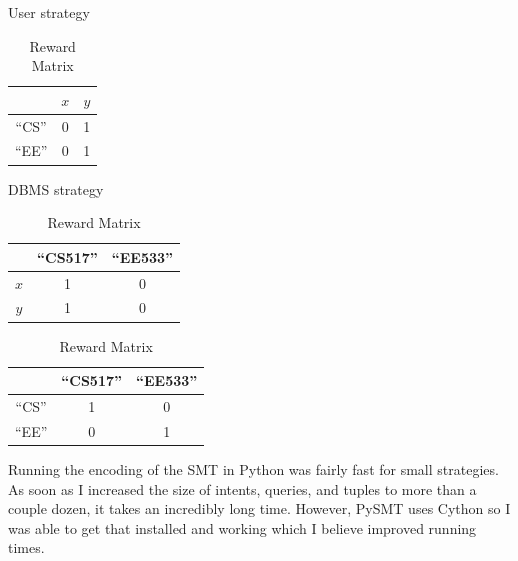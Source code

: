 \documentclass{article}
\begin{document}
\begin{table}[h!]
    \centering
    \begin{minipage}{.2\linewidth}
        \caption{User strategy}
        \centering
        \begin{tabular}{c|c|c|}
            \cline{2-3}
             & \multicolumn{1}{c|}{$x$} & $y$\\
            \hline
            \multicolumn{1}{|c|}{``CS''} & 0 & 1\\
            \hline
            \multicolumn{1}{|c|}{``EE''} & 0 & 1\\
            \hline
        \end{tabular}
        \label{paper:strategies:sender}
    \end{minipage}
    \begin{minipage}{.35\linewidth}
        \caption{DBMS strategy}
        \centering
        \begin{tabular}{c|c|c|}
            \cline{2-3}
             & \multicolumn{1}{c|}{``CS517''} & ``EE533''\\
            \hline
            \multicolumn{1}{|c|}{$x$} & 1 & 0\\
            \hline
            \multicolumn{1}{|c|}{$y$} & 1 & 0\\
            \hline
        \end{tabular}
        \label{paper:strategies:receiver}
    \end{minipage}
       \begin{minipage}{.3\linewidth}
        \caption{Reward Matrix}
        \centering
        \begin{tabular}{c|c|c|}
            \cline{2-3}
             & \multicolumn{1}{c|}{``CS517''} & ``EE533''\\
            \hline
            \multicolumn{1}{|c|}{``CS''} & 1 & 0\\
            \hline
            \multicolumn{1}{|c|}{``EE''} & 0 & 1\\
            \hline
        \end{tabular}
        \label{paper:strategies:reward}
    \end{minipage}
\end{table}

Running the encoding of the SMT in Python was fairly fast for small strategies. As soon as I increased the size of intents, queries, and tuples to more than a couple dozen, it takes an incredibly long time. However, PySMT uses Cython so I was able to get that installed and working which I believe improved running times. 



\end{document}
